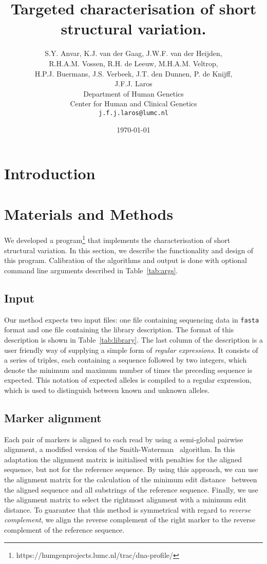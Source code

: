 \documentclass{article}
\title{\Huge Targeted characterisation of short structural variation.}
\author{S.Y. Anvar, K.J. van der Gaag, J.W.F. van der Heijden,\\
  R.H.A.M. Vossen, R.H. de Leeuw, M.H.A.M. Veltrop,\\
  H.P.J. Buermans, J.S. Verbeek, J.T. den Dunnen, P. de Knijff,\\
  J.F.J. Laros
  \vspace{10pt}\\
  Department of Human Genetics\\
  Center for Human and Clinical Genetics\\
  \texttt{j.f.j.laros@lumc.nl}}
\date{\today}
\begin{document}
\maketitle

\begin{abstract} \noindent
\end{abstract}

\section{Introduction}\label{introduction}

\section{Materials and Methods}
We developed a
program\footnote{https://humgenprojects.lumc.nl/trac/dna-profile/} that
implements the characterisation of short structural variation. In this section,
we describe the functionality and design of this program. Calibration of the
algorithms and output is done with optional command line arguments described in
Table~\ref{tab:args}.

\subsection{Input} \label{subsec:input}
Our method expects two input files: one file containing sequencing data in
\texttt{fasta} format and one file containing the library description. The
format of this description is shown in Table~\ref{tab:library}. The last column
of the description is a user friendly way of supplying a simple form of
\emph{regular expressions}. It consists of a series of triples, each containing
a sequence followed by two integers, which denote the minimum and maximum
number of times the preceding sequence is expected. This notation of expected
alleles is compiled to a regular expression, which is used to distinguish
between known and unknown alleles.

\subsection{Marker alignment} \label{subsec:align}
Each pair of markers is aligned to each read by using a semi-global pairwise
alignment, a modified version of the Smith-Waterman~\cite{LA1} algorithm. In
this adaptation the alignment matrix is initialised with penalties for the
aligned sequence, but not for the reference sequence. By using this approach,
we can use the alignment matrix for the calculation of the minimum edit
distance~\cite{Lev} between the aligned sequence and all substrings of the
reference sequence. Finally, we use the alignment matrix to select the
rightmost alignment with a minimum edit distance. To guarantee that this method
is symmetrical with regard to \emph{reverse complement}, we align the reverse
complement of the right marker to the reverse complement of the reference
sequence.
\end{document}
